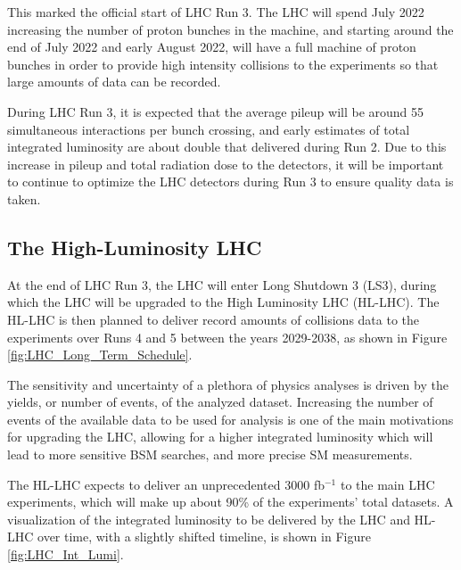 This marked the official start of LHC Run 3. The LHC will spend July 2022 increasing the number of proton bunches in the machine, and starting around the end of July 2022 and early August 2022, will have a full machine of proton bunches in order to provide high intensity collisions to the experiments so that large amounts of data can be recorded.

During LHC Run 3, it is expected that the average pileup will be around 55 simultaneous interactions per bunch crossing, and early estimates of total integrated luminosity are about double that delivered during Run 2. Due to this increase in pileup and total radiation dose to the detectors, it will be important to continue to optimize the LHC detectors during Run 3 to ensure quality data is taken. 

\subsection{The High-Luminosity LHC}

At the end of LHC Run 3, the LHC will enter Long Shutdown 3 (LS3), during which the LHC will be upgraded to the High Luminosity LHC (HL-LHC). The HL-LHC is then planned to deliver record amounts of collisions data to the experiments over Runs 4 and 5 between the years 2029-2038, as shown in Figure \ref{fig:LHC_Long_Term_Schedule}. 

The sensitivity and uncertainty of a plethora of physics analyses is driven by the yields, or number of events, of the analyzed dataset. Increasing the number of events of the available data to be used for analysis is one of the main motivations for upgrading the LHC, allowing for a higher integrated luminosity which will lead to more sensitive BSM searches, and more precise SM measurements. 

The HL-LHC expects to deliver an unprecedented 3000 fb$^{-1}$ to the main LHC experiments, which will make up about 90\% of the experiments' total datasets. A visualization of the integrated luminosity to be delivered by the LHC and HL-LHC over time, with a slightly shifted timeline, is shown in Figure \ref{fig:LHC_Int_Lumi}.

